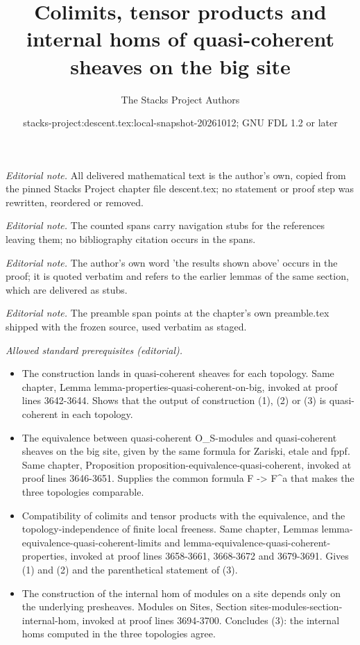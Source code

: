 \documentclass{stacks-project}
\title{Colimits, tensor products and internal homs of quasi-coherent sheaves on the big site}
\author{The Stacks Project Authors}
\date{stacks-project:descent.tex:local-snapshot-20261012; GNU FDL 1.2 or later}
\theoremstyle{plain}
\theoremstyle{definition}
\theoremstyle{remark}
\numberwithin{equation}{subsection}
\begin{document}
\maketitle
\noindent\textit{Editorial note.} All delivered mathematical text is the author's own, copied from the pinned Stacks Project chapter file descent.tex; no statement or proof step was rewritten, reordered or removed.\par\medskip
\noindent\textit{Editorial note.} The counted spans carry navigation stubs for the references leaving them; no bibliography citation occurs in the spans.\par\medskip
\noindent\textit{Editorial note.} The author's own word 'the results shown above' occurs in the proof; it is quoted verbatim and refers to the earlier lemmas of the same section, which are delivered as stubs.\par\medskip
\noindent\textit{Editorial note.} The preamble span points at the chapter's own preamble.tex shipped with the frozen source, used verbatim as staged.\par\medskip
\noindent\textit{Allowed standard prerequisites (editorial).}\begin{itemize}
\item The construction lands in quasi-coherent sheaves for each topology. Same chapter, Lemma lemma-properties-quasi-coherent-on-big, invoked at proof lines 3642-3644. Shows that the output of construction (1), (2) or (3) is quasi-coherent in each topology.
\item The equivalence between quasi-coherent O\_S-modules and quasi-coherent sheaves on the big site, given by the same formula for Zariski, etale and fppf. Same chapter, Proposition proposition-equivalence-quasi-coherent, invoked at proof lines 3646-3651. Supplies the common formula F -> F\textasciicircum{}a that makes the three topologies comparable.
\item Compatibility of colimits and tensor products with the equivalence, and the topology-independence of finite local freeness. Same chapter, Lemmas lemma-equivalence-quasi-coherent-limits and lemma-equivalence-quasi-coherent-properties, invoked at proof lines 3658-3661, 3668-3672 and 3679-3691. Gives (1) and (2) and the parenthetical statement of (3).
\item The construction of the internal hom of modules on a site depends only on the underlying presheaves. Modules on Sites, Section sites-modules-section-internal-hom, invoked at proof lines 3694-3700. Concludes (3): the internal homs computed in the three topologies agree.
\end{itemize}\medskip
\end{document}
